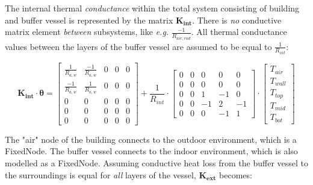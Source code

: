 The internal thermal \emph{conductance} within the total system consisting of building and buffer vessel is represented by the matrix $\mathbf{K_{int}}$. There is \emph{no} conductive matrix element \emph{between} subsystems, like \textit{e.g.} $\frac{-1}{R_{air,rad}}$. All thermal conductance values between the layers of the buffer vessel are assumed to be equal to $\frac{1}{R_{int}}$:

\begin{equation}
	\mathbf{K_{int}} \cdot \boldsymbol{\theta} = 
	\begin{bmatrix}
		\frac{1}{R_{a,w}} & \frac{-1}{R_{a,w}} & 0 & 0 & 0 \\
		\frac{-1}{R_{a,w}} & \frac{1}{R_{a,w}} & 0 & 0 & 0 \\
		0 & 0 & 0 & 0 & 0 \\
		0 & 0 & 0 & 0 & 0 \\
		0 & 0 & 0 & 0 & 0  
	\end{bmatrix}
    +
	\frac{1}{R_{int}} \cdot
	\begin{bmatrix}
		0 & 0 & 0 & 0 & 0 \\
		0 & 0 & 0 & 0 & 0 \\
		0 & 0 & 1 & -1 & 0 \\
		0 & 0 & -1 & 2 & -1 \\
		0 & 0 & 0 & -1 & 1  
	\end{bmatrix}
    \cdot
	\begin{bmatrix}
		T_{air} \\
		T_{wall} \\
		T_{top} \\
		T_{mid} \\
		T_{bot}
	\end{bmatrix}
\end{equation}

The "air" node of the building connects to the outdoor environment, which is a \textsf{FixedNode}. The buffer vessel connects to the indoor environment, which is also modelled as a \textsf{FixedNode}. Assuming conductive heat loss from the buffer vessel to the surroundings is equal for \emph{all} layers of the vessel, $\mathbf{K_{ext}}$ becomes:

